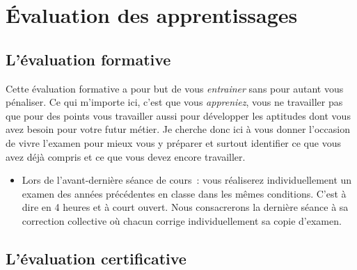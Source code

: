 \clearpage
\section{Évaluation des apprentissages}

\subsection{L’évaluation formative}

\label{eval_formative}
Cette évaluation formative a pour but de vous \emph{entrainer} sans pour autant vous pénaliser. Ce qui m'importe ici, c'est que vous \emph{appreniez}, vous ne travailler pas que pour des points vous travailler aussi pour développer les aptitudes dont vous avez besoin pour votre futur métier. Je cherche donc ici à vous donner l'occasion de vivre l'examen pour mieux vous y préparer et surtout identifier ce que vous avez déjà compris et ce que vous devez encore travailler.
\begin{itemize}
    \item Lors de l'avant-dernière séance de cours~: vous réaliserez individuellement un examen des années précédentes en classe dans les mêmes conditions. C'est à dire en 4 heures et à court ouvert. Nous consacrerons la dernière séance à sa correction collective où chacun corrige individuellement sa copie d'examen.
\end{itemize}

\subsection{L’évaluation certificative}

